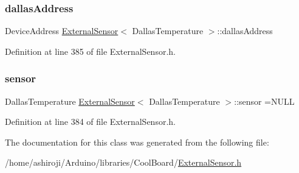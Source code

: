 \subsubsection{\texorpdfstring{dallas\+Address}{dallasAddress}}
{\footnotesize\ttfamily Device\+Address \hyperlink{classExternalSensor}{External\+Sensor}$<$ Dallas\+Temperature $>$\+::dallas\+Address\hspace{0.3cm}{\ttfamily [private]}}



Definition at line 385 of file External\+Sensor.\+h.

\mbox{\label{classExternalSensor_3_01DallasTemperature_01_4_adb6ba4fcdedef95ad8f6b0c9b6c0f9d1}} 
\subsubsection{\texorpdfstring{sensor}{sensor}}
{\footnotesize\ttfamily Dallas\+Temperature \hyperlink{classExternalSensor}{External\+Sensor}$<$ Dallas\+Temperature $>$\+::sensor =N\+U\+LL\hspace{0.3cm}{\ttfamily [private]}}



Definition at line 384 of file External\+Sensor.\+h.



The documentation for this class was generated from the following file\+:\begin{DoxyCompactItemize}
\item 
/home/ashiroji/\+Arduino/libraries/\+Cool\+Board/\hyperlink{ExternalSensor_8h}{External\+Sensor.\+h}\end{DoxyCompactItemize}
